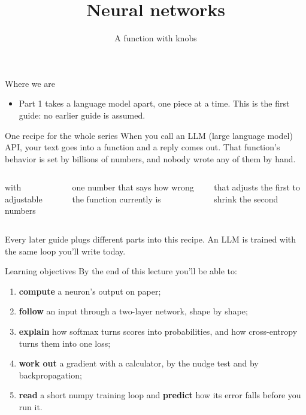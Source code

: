 \documentclass[aspectratio=169,11pt,t,\primeropts]{beamer}
\title{Neural networks}
\subtitle{A function with knobs}
\begin{document}
\begin{frame}
  \titlepage
\end{frame}

\begin{frame}{Where we are}
  \begin{center}\primerseriesmap\end{center}
  \vspace{2mm}
  \begin{itemize}
    \item Part 1 takes a language model apart, one piece at a time. This is the first guide: no
      earlier guide is assumed.
  \end{itemize}
\end{frame}

\begin{frame}{One recipe for the whole series}
  When you call an LLM (large language model) API, your text goes into a function and a reply
  comes out. That function's behavior is set by billions of numbers, and nobody wrote any of
  them by hand.
  \vspace{4mm}
  \begin{columns}[T]
    \begin{keyidea}
      with adjustable numbers
    \end{keyidea}
    \begin{keyidea}
      one number that says how wrong the function currently is
    \end{keyidea}
    \begin{keyidea}
      that adjusts the first to shrink the second
    \end{keyidea}
  \end{columns}
  \vspace{4mm}
  Every later guide plugs different parts into this recipe. An LLM is trained with the same loop
  you'll write today.
\end{frame}

\begin{frame}{Learning objectives}
  By the end of this lecture you'll be able to:
  \begin{enumerate}
    \item \textbf{compute} a neuron's output on paper;
    \item \textbf{follow} an input through a two-layer network, shape by shape;
    \item \textbf{explain} how softmax turns scores into probabilities, and how cross-entropy
      turns them into one loss;
    \item \textbf{work out} a gradient with a calculator, by the nudge test and by
      backpropagation;
    \item \textbf{read} a short numpy training loop and \textbf{predict} how its error falls
      before you run it.
  \end{enumerate}
\end{frame}
\end{document}

